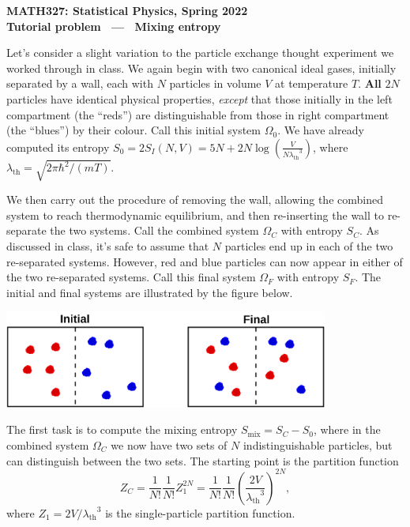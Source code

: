 \documentclass[12 pt]{article} %
\newcommand{\la}{\ensuremath{\lambda} }
\newcommand{\lath}{\ensuremath{\la_{\mathrm{th}}} }
\newcommand{\Om}{\ensuremath{\Omega} }
\begin{document}
\newcommand{\thisunit}{MATH327 Tutorial (Mixing)}
\newcommand{\moddate}{Last modified 4 Mar.~2022}
\begin{center}
  {\Large \textbf{MATH327: Statistical Physics, Spring 2022}} \\[12 pt]
  {\Large \textbf{Tutorial problem \ --- \ Mixing entropy}} \\[24 pt]
\end{center}

Let's consider a slight variation to the particle exchange thought experiment we worked through in class.
We again begin with two canonical ideal gases, initially separated by a wall, each with $N$ particles in volume $V$ at temperature $T$.
\textbf{All} $2N$ particles have identical physical properties, \textit{except} that those initially in the left compartment (the ``reds'') are distinguishable from those in right compartment (the ``blues'') by their colour.
Call this initial system $\Om_0$.
We have already computed its entropy $S_0 = 2S_I(N, V) = 5N + 2N\log\left(\frac{V}{N\lath^3}\right)$, where $\lath = \sqrt{2\pi\hbar^2 / (mT)}$.

We then carry out the procedure of removing the wall, allowing the combined system to reach thermodynamic equilibrium, and then re-inserting the wall to re-separate the two systems.
Call the combined system $\Om_C$ with entropy $S_C$.
As discussed in class, it's safe to assume that $N$ particles end up in each of the two re-separated systems.
However, red and blue particles can now appear in either of the two re-separated systems.
Call this final system $\Om_F$ with entropy $S_F$.
The initial and final systems are illustrated by the figure below.

\begin{center}\includegraphics[width=0.8\textwidth]{figs/mix.pdf}\end{center}

The first task is to compute the mixing entropy $S_{\text{mix}} = S_C - S_0$, where in the combined system $\Om_C$ we now have two sets of $N$ indistinguishable particles, but can distinguish between the two sets.
The starting point is the partition function
\begin{equation*}
  Z_C = \frac{1}{N!} \frac{1}{N!} Z_1^{2N} = \frac{1}{N!} \frac{1}{N!} \left(\frac{2V}{\lath^3}\right)^{2N},
\end{equation*}
where $Z_1 = 2V / \lath^3$ is the single-particle partition function.
\end{document}
